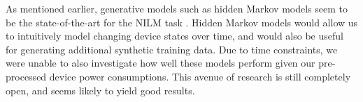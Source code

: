 \documentclass{article}
\begin{document}
As mentioned earlier, generative models such as hidden Markov models seem to be the state-of-the-art for the NILM task \cite{Kolter}\cite{Parson}.
Hidden Markov models would allow us to intuitively model changing device states over time, and would also be useful for generating additional synthetic training data.
Due to time constraints, we were unable to also investigate how well these models perform given our pre-processed device power consumptions.
This avenue of research is still completely open, and seems likely to yield good results.




\end{document}
